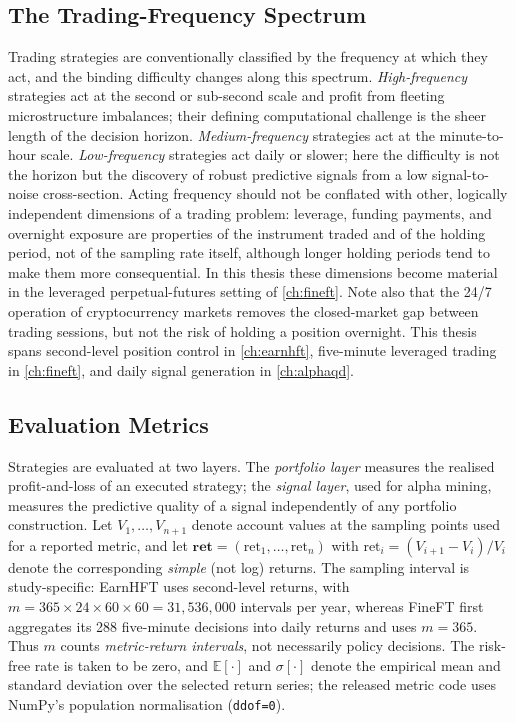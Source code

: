 \subsection{The Trading-Frequency Spectrum}
\label{sec:bg_frequency}

Trading strategies are conventionally classified by the frequency at which they act, and the binding difficulty changes along this spectrum. \emph{High-frequency} strategies act at the second or sub-second scale and profit from fleeting microstructure imbalances; their defining computational challenge is the sheer length of the decision horizon. \emph{Medium-frequency} strategies act at the minute-to-hour scale. \emph{Low-frequency} strategies act daily or slower; here the difficulty is not the horizon but the discovery of robust predictive signals from a low signal-to-noise cross-section. Acting frequency should not be conflated with other, logically independent dimensions of a trading problem: leverage, funding payments, and overnight exposure are properties of the instrument traded and of the holding period, not of the sampling rate itself, although longer holding periods tend to make them more consequential. In this thesis these dimensions become material in the leveraged perpetual-futures setting of \cref{ch:fineft}. Note also that the 24/7 operation of cryptocurrency markets removes the closed-market gap between trading sessions, but not the risk of holding a position overnight. This thesis spans second-level position control in \cref{ch:earnhft}, five-minute leveraged trading in \cref{ch:fineft}, and daily signal generation in \cref{ch:alphaqd}.

\subsection{Evaluation Metrics}
\label{sec:bg_metrics}

Strategies are evaluated at two layers. The \emph{portfolio layer} measures the realised profit-and-loss of an executed strategy; the \emph{signal layer}, used for alpha mining, measures the predictive quality of a signal independently of any portfolio construction. Let $V_1,\dots,V_{n+1}$ denote account values at the sampling points used for a reported metric, and let $\mathbf{ret}=(\mathrm{ret}_1,\dots,\mathrm{ret}_n)$ with $\mathrm{ret}_i=(V_{i+1}-V_i)/V_i$ denote the corresponding \emph{simple} (not log) returns. The sampling interval is study-specific: EarnHFT uses second-level returns, with $m=365\times24\times60\times60=31{,}536{,}000$ intervals per year, whereas FineFT first aggregates its 288 five-minute decisions into daily returns and uses $m=365$. Thus $m$ counts \emph{metric-return intervals}, not necessarily policy decisions. The risk-free rate is taken to be zero, and $\mathbb{E}[\cdot]$ and $\sigma[\cdot]$ denote the empirical mean and standard deviation over the selected return series; the released metric code uses NumPy's population normalisation (\texttt{ddof=0}).

